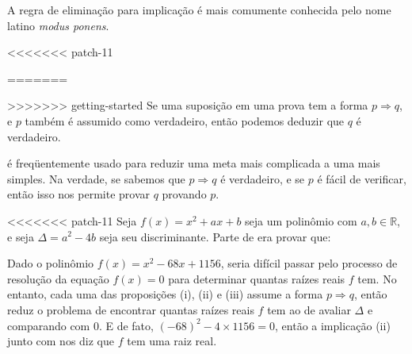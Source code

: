 \begin{itemizar}
A regra de eliminação para implicação \elimrule{\Rightarrow} é mais comumente conhecida pelo nome latino \textit{modus ponens}.

<<<<<<< patch-11
\begin{strategy}
=======
\begin{strategy}
>>>>>>> getting-started
\label{strAssumingImplicationsDirect}
Se uma suposição em uma prova tem a forma $p \Rightarrow q$, e $p$ também é assumido como verdadeiro, então podemos deduzir que $q$ é verdadeiro.
\end{strategy}

 é freqüentemente usado para reduzir uma meta mais complicada a uma mais simples. Na verdade, se sabemos que $p \Rightarrow q$ é verdadeiro, e se $p$ é fácil de verificar, então isso nos permite provar $q$ provando $p$.

\begin{example}
<<<<<<< patch-11
Seja $f(x) = x^2+ax+b$ seja um polinômio com $a,b \in \mathbb{R}$, e seja $\Delta = a^2-4b$ seja seu discriminante. Parte de  era provar que:
Dado o polinômio $f(x) = x^2-68x+1156$, seria difícil passar pelo processo de resolução da equação $f(x)=0$ para determinar quantas raízes reais $f $ tem. No entanto, cada uma das proposições (i), (ii) e (iii) assume a forma $p \Rightarrow q$, então  reduz o problema de encontrar quantas raízes reais $f$ tem ao de avaliar $\Delta$ e comparando com $0$. E de fato, $(-68)^2 - 4 \times 1156 = 0$, então a implicação (ii) junto com \elimrule{\Rightarrow} nos diz que $f$ tem uma raiz real.
\end{example}


\end{strategy}
\end{itemizar}
